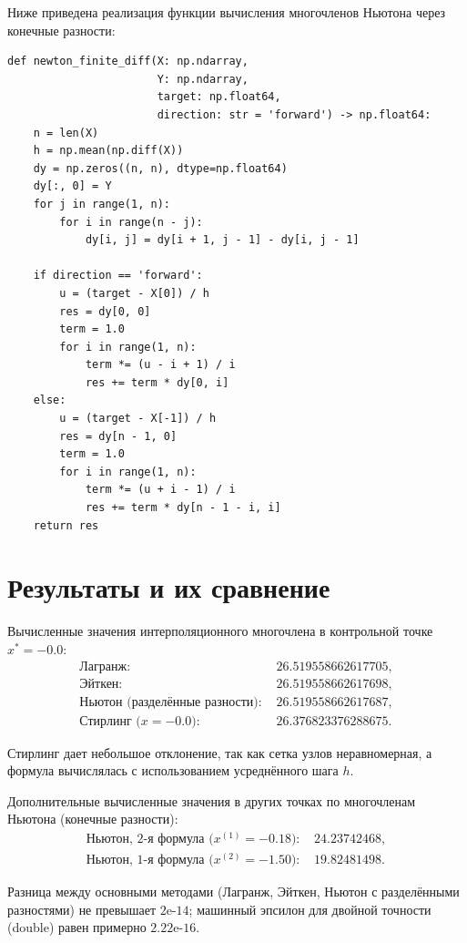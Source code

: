 Ниже приведена реализация функции вычисления многочленов Ньютона через конечные разности:
\begin{lstlisting}[style=pythonstyle,caption={Реализация Ньютона (конечные разности)}]
def newton_finite_diff(X: np.ndarray,
                       Y: np.ndarray,
                       target: np.float64,
                       direction: str = 'forward') -> np.float64:
    n = len(X)
    h = np.mean(np.diff(X))
    dy = np.zeros((n, n), dtype=np.float64)
    dy[:, 0] = Y
    for j in range(1, n):
        for i in range(n - j):
            dy[i, j] = dy[i + 1, j - 1] - dy[i, j - 1]

    if direction == 'forward':
        u = (target - X[0]) / h
        res = dy[0, 0]
        term = 1.0
        for i in range(1, n):
            term *= (u - i + 1) / i
            res += term * dy[0, i]
    else:
        u = (target - X[-1]) / h
        res = dy[n - 1, 0]
        term = 1.0
        for i in range(1, n):
            term *= (u + i - 1) / i
            res += term * dy[n - 1 - i, i]
    return res
\end{lstlisting}

\section{Результаты и их сравнение}
Вычисленные значения интерполяционного многочлена в контрольной точке $x^{*}=-0.0$:
\[
\begin{aligned}
\text{Лагранж: } & 26.519558662617705,\\
\text{Эйткен: } & 26.519558662617698,\\
\text{Ньютон (разделённые разности): } & 26.519558662617687,\\
\text{Стирлинг ($x=-0.0$): } & 26.376823376288675.
\end{aligned}
\]

Стирлинг дает небольшое отклонение, так как сетка узлов неравномерная, а формула вычислялась с использованием усреднённого шага $h$.

Дополнительные вычисленные значения в других точках по многочленам Ньютона (конечные разности):
\[
\begin{aligned}
\text{Ньютон, 2-я формула ($x^{(1)}=-0.18$): } & 24.23742468,\\
\text{Ньютон, 1-я формула ($x^{(2)}=-1.50$): } & 19.82481498.
\end{aligned}
\]

Разница между основными методами (Лагранж, Эйткен, Ньютон с разделёнными разностями) не превышает $2\text{e-14}$; машинный эпсилон для двойной точности (double) равен примерно $2.22\text{e-16}$.

